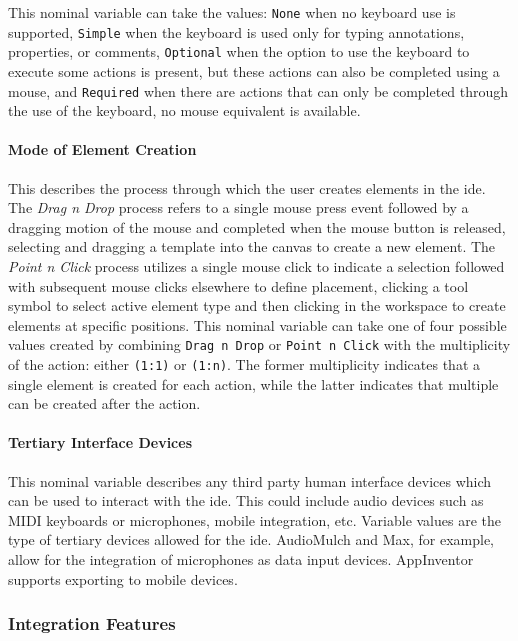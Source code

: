 This nominal variable can take the values: \texttt{None} when no keyboard
use is supported, \texttt{Simple} when the keyboard is used only for typing
annotations, properties, or comments, \texttt{Optional} when the option to
use the keyboard to execute some actions is present, but these actions can
also be completed using a mouse, and \texttt{Required} when there are
actions that can only be completed through the use of the keyboard, no
mouse equivalent is available.


\paragraph{Mode of Element Creation}
This describes the process through which the user creates elements in the
\ac{ide}. The \emph{Drag n Drop} process refers to a single mouse press
event followed by a dragging motion of the mouse and completed when the
mouse button is released, \eg selecting and dragging a template into the
canvas to create a new element. The \emph{Point n Click} process utilizes a
single mouse click to indicate a selection followed with subsequent mouse
clicks elsewhere to define placement, \eg clicking a tool symbol to select
active element type and then clicking in the workspace to create elements
at specific positions. This nominal variable can take one of four possible
values created by combining \texttt{Drag n Drop} or \texttt{Point n Click}
with the multiplicity of the action: either \texttt{(1:1)} or
\texttt{(1:n)}. The former multiplicity indicates that a single element is
created for each action, while the latter indicates that multiple can be
created after the action.


\paragraph{Tertiary Interface Devices}
This nominal variable describes any
third party human interface devices which can be used to interact with the
\ac{ide}. This could include audio devices such as MIDI keyboards or
microphones, mobile integration, etc. Variable values are the type of
tertiary devices allowed for the \ac{ide}. AudioMulch and Max, for example,
allow for the integration of microphones as data input devices. AppInventor
supports exporting to mobile devices.


\subsubsection{Integration Features} \label{subsubsec:integration}

